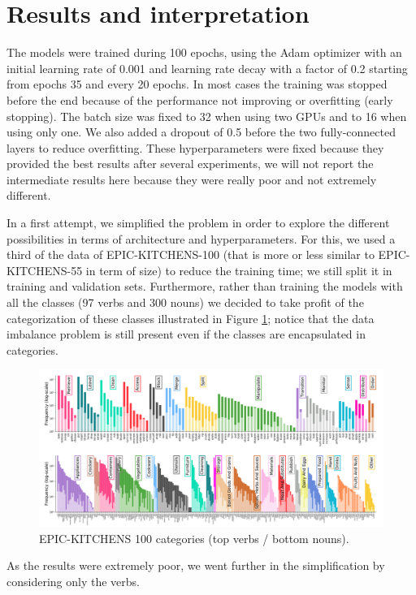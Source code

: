 \documentclass[12pt, a4paper]{report}
\begin{document}
		\section{Results and interpretation}\label{results}
			The models were trained during 100 epochs, using the Adam optimizer with an initial learning rate of 0.001 and learning rate decay with a factor of 0.2 starting from epochs 35 and every 20 epochs.
			In most cases the training was stopped before the end because of the performance not improving or overfitting (early stopping).
			The batch size was fixed to 32 when using two GPUs and to 16 when using only one.
			We also added a dropout of 0.5 before the two fully-connected layers to reduce overfitting.
			These hyperparameters were fixed because they provided the best results after several experiments, we will not report the intermediate results here because they were really poor and not extremely different.
			\par
			In a first attempt, we simplified the problem in order to explore the different possibilities in terms of architecture and hyperparameters.
			For this, we used a third of the data of EPIC-KITCHENS-100 (that is more or less similar to EPIC-KITCHENS-55 in term of size) to reduce the training time; we still split it in training and validation sets.
			Furthermore, rather than training the models with all the classes (97 verbs and 300 nouns) we decided to take profit of the categorization of these classes illustrated in Figure \ref{categories}; notice that the data imbalance problem is still present even if the classes are encapsulated in categories.
			\begin{figure}[h!]
				\centering
				\includegraphics[width=1.1\textwidth]{EPIC-100 data imbalance.png}
				\caption{EPIC-KITCHENS 100 categories (top verbs / bottom nouns).}
				\label{categories}
			\end{figure}
			As the results were extremely poor, we went further in the simplification by considering only the verbs.
\end{document}
